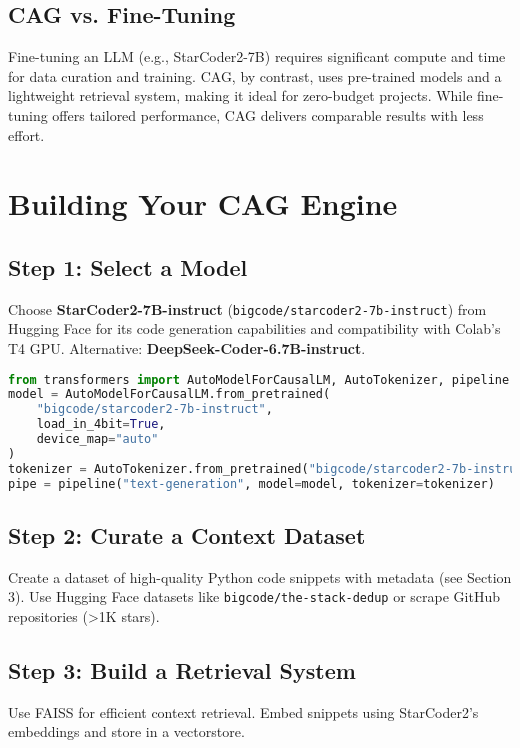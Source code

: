 \documentclass[12pt]{article}
\begin{document}
\subsection{CAG vs. Fine-Tuning}
Fine-tuning an LLM (e.g., StarCoder2-7B) requires significant compute and time for data curation and training. CAG, by contrast, uses pre-trained models and a lightweight retrieval system, making it ideal for zero-budget projects. While fine-tuning offers tailored performance, CAG delivers comparable results with less effort.

\section{Building Your CAG Engine}
\subsection{Step 1: Select a Model}
Choose \textbf{StarCoder2-7B-instruct} (\texttt{bigcode/starcoder2-7b-instruct}) from Hugging Face for its code generation capabilities and compatibility with Colab’s T4 GPU. Alternative: \textbf{DeepSeek-Coder-6.7B-instruct}.

\begin{lstlisting}[language=Python, caption=Loading StarCoder2 in Colab]
from transformers import AutoModelForCausalLM, AutoTokenizer, pipeline
model = AutoModelForCausalLM.from_pretrained(
    "bigcode/starcoder2-7b-instruct",
    load_in_4bit=True,
    device_map="auto"
)
tokenizer = AutoTokenizer.from_pretrained("bigcode/starcoder2-7b-instruct")
pipe = pipeline("text-generation", model=model, tokenizer=tokenizer)
\end{lstlisting}

\subsection{Step 2: Curate a Context Dataset}
Create a dataset of high-quality Python code snippets with metadata (see Section 3). Use Hugging Face datasets like \texttt{bigcode/the-stack-dedup} or scrape GitHub repositories (>1K stars).

\subsection{Step 3: Build a Retrieval System}
Use FAISS for efficient context retrieval. Embed snippets using StarCoder2’s embeddings and store in a vectorstore.
\end{document}
